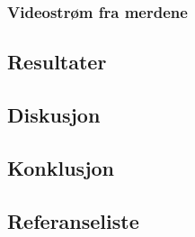 \subsubsection{Videostrøm fra merdene}
\subsection{Resultater}
\subsection{Diskusjon}
\subsection{Konklusjon}
\subsection{Referanseliste}
